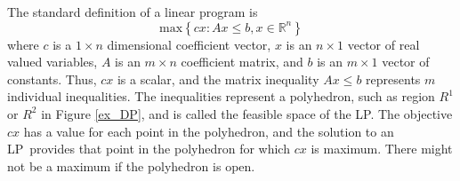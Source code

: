 \documentclass[preprint]{sigplanconf}%
\theoremstyle{remark}
\begin{document}
The standard definition of a linear program is%
\begin{equation}
\mathrm{max}\left\{  cx:Ax\leq b,x\in\mathbb{R}^{n}\right\}
\label{LP matrix def}%
\end{equation}
where $c$ is a $1\times n$ dimensional coefficient vector, $x$ is an
$n\times1$ vector of real valued variables, $A$ is an $m\times n$ coefficient
matrix, and $b$ is an $m\times1$ vector of constants. Thus, $cx$ is a scalar,
and the matrix inequality $Ax\leq b$ represents $m$ individual inequalities.
The inequalities represent a polyhedron, such as region $R^{1}$ or $R^{2}$ in
Figure \ref{ex_DP}, and is called the feasible space of the LP. The objective
$cx$ has a value for each point in the polyhedron, and the solution to an
LP\ provides that point in the polyhedron for which $cx$ is maximum. There
might not be a maximum if the polyhedron is open.%
\end{document}

